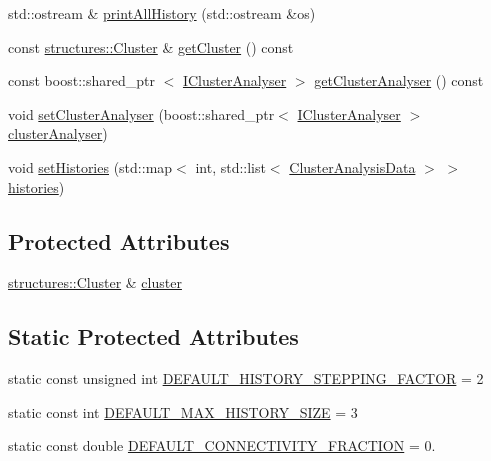 \begin{DoxyCompactItemize}
\item 
std\-::ostream \& \hyperlink{classcryomesh_1_1manipulators_1_1ClusterArchitect_a27c696f8203fb914e51a223eee562254}{print\-All\-History} (std\-::ostream \&os)
\item 
const \hyperlink{classcryomesh_1_1structures_1_1Cluster}{structures\-::\-Cluster} \& \hyperlink{classcryomesh_1_1manipulators_1_1ClusterArchitect_a3e561db659ae0d4a4d46e22741772994}{get\-Cluster} () const 
\item 
const boost\-::shared\-\_\-ptr\*
$<$ \hyperlink{classcryomesh_1_1manipulators_1_1IClusterAnalyser}{\-I\-Cluster\-Analyser} $>$ \hyperlink{classcryomesh_1_1manipulators_1_1ClusterArchitect_aa46dba6257689b3c467afb988f2efb22}{get\-Cluster\-Analyser} () const 
\item 
void \hyperlink{classcryomesh_1_1manipulators_1_1ClusterArchitect_a88493418dae7b67370f090c389ae0bfa}{set\-Cluster\-Analyser} (boost\-::shared\-\_\-ptr$<$ \hyperlink{classcryomesh_1_1manipulators_1_1IClusterAnalyser}{\-I\-Cluster\-Analyser} $>$ \hyperlink{classcryomesh_1_1manipulators_1_1ClusterArchitect_a376af658286be49dc6fc5fea9927c7bc}{cluster\-Analyser})
\item 
void \hyperlink{classcryomesh_1_1manipulators_1_1ClusterArchitect_af8c67291845601ffd8c9e740ea868db0}{set\-Histories} (std\-::map$<$ int, std\-::list$<$ \hyperlink{classcryomesh_1_1manipulators_1_1ClusterAnalysisData}{\-Cluster\-Analysis\-Data} $>$ $>$ \hyperlink{classcryomesh_1_1manipulators_1_1ClusterArchitect_a8414fe32bad8df5943f91018b9258112}{histories})
\end{DoxyCompactItemize}
\subsection*{\-Protected \-Attributes}
\begin{DoxyCompactItemize}
\item 
\hyperlink{classcryomesh_1_1structures_1_1Cluster}{structures\-::\-Cluster} \& \hyperlink{classcryomesh_1_1manipulators_1_1ClusterArchitect_a66c39a642d37c989c59c6176adfe12c1}{cluster}
\end{DoxyCompactItemize}
\subsection*{\-Static \-Protected \-Attributes}
\begin{DoxyCompactItemize}
\item 
static const unsigned int \hyperlink{classcryomesh_1_1manipulators_1_1ClusterArchitect_ab79a6ae93e47eaf107d78ed558f41d83}{\-D\-E\-F\-A\-U\-L\-T\-\_\-\-H\-I\-S\-T\-O\-R\-Y\-\_\-\-S\-T\-E\-P\-P\-I\-N\-G\-\_\-\-F\-A\-C\-T\-O\-R} = 2
\item 
static const int \hyperlink{classcryomesh_1_1manipulators_1_1ClusterArchitect_aedfa4722a69f72fcb1a9094dd584495d}{\-D\-E\-F\-A\-U\-L\-T\-\_\-\-M\-A\-X\-\_\-\-H\-I\-S\-T\-O\-R\-Y\-\_\-\-S\-I\-Z\-E} = 3
\item 
static const double \hyperlink{classcryomesh_1_1manipulators_1_1ClusterArchitect_a6ce4a9d1278748853bd451ef7adcfb36}{\-D\-E\-F\-A\-U\-L\-T\-\_\-\-C\-O\-N\-N\-E\-C\-T\-I\-V\-I\-T\-Y\-\_\-\-F\-R\-A\-C\-T\-I\-O\-N} = 0.
\end{DoxyCompactItemize}
